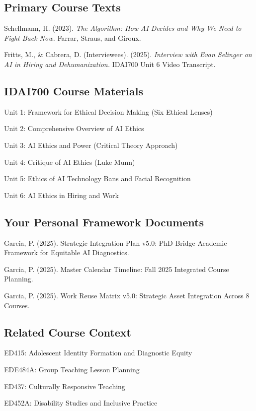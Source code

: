 \documentclass[12pt,letterpaper]{article}
\begin{document}
\subsection*{Primary Course Texts}

Schellmann, H. (2023). \textit{The Algorithm: How AI Decides and Why We Need to Fight Back Now.} Farrar, Straus, and Giroux.

Fritts, M., \& Cabrera, D. (Interviewees). (2025). \textit{Interview with Evan Selinger on AI in Hiring and Dehumanization.} IDAI700 Unit 6 Video Transcript.

\subsection*{IDAI700 Course Materials}

Unit 1: Framework for Ethical Decision Making (Six Ethical Lenses)

Unit 2: Comprehensive Overview of AI Ethics

Unit 3: AI Ethics and Power (Critical Theory Approach)

Unit 4: Critique of AI Ethics (Luke Munn)

Unit 5: Ethics of AI Technology Bans and Facial Recognition

Unit 6: AI Ethics in Hiring and Work

\subsection*{Your Personal Framework Documents}

Garcia, P. (2025). Strategic Integration Plan v5.0: PhD Bridge Academic Framework for Equitable AI Diagnostics.

Garcia, P. (2025). Master Calendar Timeline: Fall 2025 Integrated Course Planning.

Garcia, P. (2025). Work Reuse Matrix v5.0: Strategic Asset Integration Across 8 Courses.

\subsection*{Related Course Context}

ED415: Adolescent Identity Formation and Diagnostic Equity

EDE484A: Group Teaching Lesson Planning

ED437: Culturally Responsive Teaching

ED452A: Disability Studies and Inclusive Practice
\end{document}
